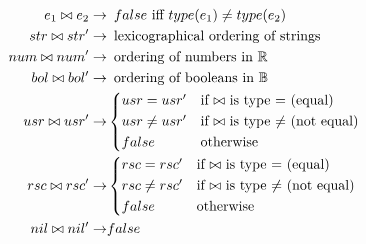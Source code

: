 \begin{align*}
    e_1 \bowtie e_2 \imply& \enskip false \text{ iff } type(e_1) \neq type(e_2) \\
    str \bowtie str' \imply& \enskip \text{lexicographical ordering of strings} \\
    num \bowtie num' \imply& \enskip \text{ordering of numbers in } \mathbb{R} \\
    bol \bowtie bol' \imply& \enskip \text{ordering of booleans in } \mathbb{B} \\
    usr \bowtie usr' \imply&
        \begin{cases*}
            usr = usr'      & if $\bowtie$ is type $=$ (equal) \\
            usr \neq usr'   & if $\bowtie$ is type $\neq$ (not equal) \\
            false       & otherwise
        \end{cases*} \\
    rsc \bowtie rsc' \imply&
        \begin{cases*}
            rsc = rsc'      & if $\bowtie$ is type $=$ (equal) \\
            rsc \neq rsc'   & if $\bowtie$ is type $\neq$ (not equal) \\
            false       & otherwise
        \end{cases*} \\
    nil \bowtie nil' \imply& false
\end{align*}

